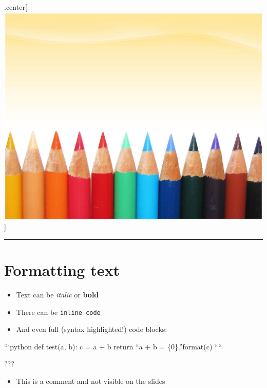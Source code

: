 \documentclass[]{article}
\begin{document}
.center{[}\includegraphics{image.png}{]}

\begin{center}\rule{3in}{0.4pt}\end{center}

\section{Formatting text}\label{formatting-text}

\begin{itemize}
\item
  Text can be \emph{italic} or \textbf{bold}
\item
  There can be \texttt{inline code}
\item
  And even full (syntax highlighted!) code blocks:
\end{itemize}

```python def test(a, b): c = a + b return ``a + b = \{0\}.''format(c)
````

???

\begin{itemize}
\itemsep1pt\parskip0pt
\item
  This is a comment and not visible on the slides
\end{itemize}
\end{document}
